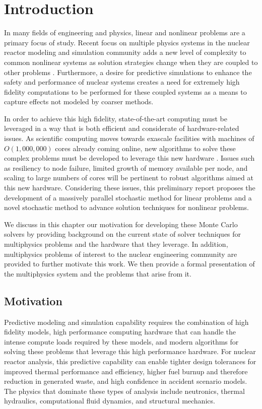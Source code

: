 \chapter{Introduction}
\label{ch:introduction}
In many fields of engineering and physics, linear and nonlinear
problems are a primary focus of study. Recent focus on multiple
physics systems in the nuclear reactor modeling and simulation
community adds a new level of complexity to common nonlinear systems
as solution strategies change when they are coupled to other problems
\citep{u.s._department_of_energy_casl_2011}. Furthermore, a desire
for predictive simulations to enhance the safety and performance of
nuclear systems creates a need for extremely high fidelity
computations to be performed for these coupled systems as a means to
capture effects not modeled by coarser methods.

In order to achieve this high fidelity, state-of-the-art computing
 must be leveraged in a way that is both efficient and
considerate of hardware-related issues. As scientific computing moves
towards exascale facilities with machines of $O(1,000,000)$ cores
already coming online, new algorithms to solve these complex problems
must be developed to leverage this new hardware
\citep{kogge_using_2011}. Issues such as resiliency to node failure,
limited growth of memory available per node, and scaling to large
numbers of cores will be pertinent to robust algorithms aimed at this
new hardware. Considering these issues, this preliminary report
proposes the development of a massively parallel stochastic method for
linear problems and a novel stochastic method to advance solution
techniques for nonlinear problems.

We discuss in this chapter our motivation for developing these Monte
Carlo solvers by providing background on the current state of solver
techniques for multiphysics problems and the hardware that they
leverage. In addition, multiphysics problems of interest to the
nuclear engineering community are provided to further motivate this
work. We then provide a formal presentation of the multiphysics system
and the problems that arise from it.

\section{Motivation}
\label{sec:motivation}
Predictive modeling and simulation capability requires the combination
of high fidelity models, high performance computing hardware that can
handle the intense compute loads required by these models, and modern
algorithms for solving these problems that leverage this high
performance hardware. For nuclear reactor analysis, this predictive
capability can enable tighter design tolerances for improved thermal
performance and efficiency, higher fuel burnup and therefore reduction
in generated waste, and high confidence in accident scenario
models. The physics that dominate these types of analysis include
neutronics, thermal hydraulics, computational fluid dynamics, and
structural mechanics. 

